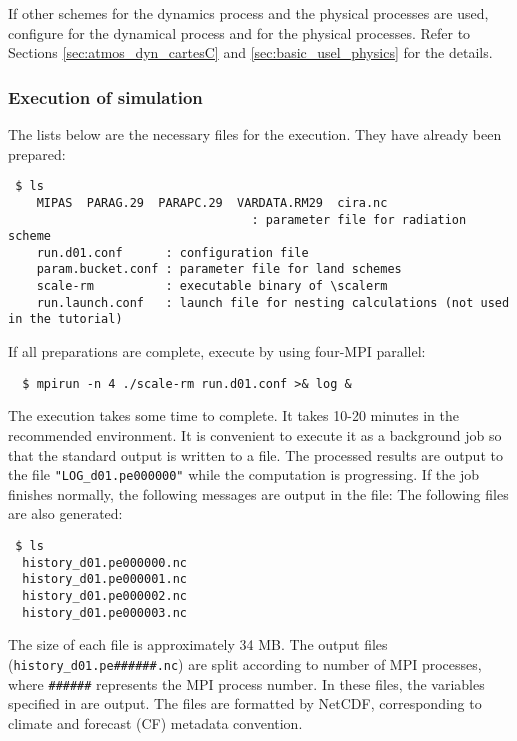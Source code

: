 If other schemes for the dynamics process and the physical processes are used,
configure  for the dynamical process and
 for the physical processes.
Refer to Sections \ref{sec:atmos_dyn_cartesC} and \ref{sec:basic_usel_physics}  for the details.


\subsubsection{Execution of simulation}

The lists below are the necessary files for the execution. They have already been prepared:
\begin{verbatim}
 $ ls
    MIPAS  PARAG.29  PARAPC.29  VARDATA.RM29  cira.nc
                                  : parameter file for radiation scheme
    run.d01.conf      : configuration file
    param.bucket.conf : parameter file for land schemes
    scale-rm          : executable binary of \scalerm
    run.launch.conf   : launch file for nesting calculations (not used in the tutorial)
\end{verbatim}
If all preparations are complete, execute \scalerm by using four-MPI parallel:
\begin{verbatim}
  $ mpirun -n 4 ./scale-rm run.d01.conf >& log &
\end{verbatim}
The execution takes some time to complete. It takes 10-20 minutes in the recommended environment. It is convenient to execute it as a background job  so that the standard output is written to a file. The processed results are output to the file \verb|"LOG_d01.pe000000"| while the computation is progressing.  If the job finishes normally, the following messages are output in the file:
The following files are also generated:
\begin{verbatim}
 $ ls
  history_d01.pe000000.nc
  history_d01.pe000001.nc
  history_d01.pe000002.nc
  history_d01.pe000003.nc
\end{verbatim}
The size of each file is approximately 34 MB.
The output files (\verb|history_d01.pe######.nc|) are
split according to number of MPI processes,
where \verb|######| represents the MPI process number.
In these files, the variables specified in  are output.
The files are formatted by NetCDF,
corresponding to climate and forecast (CF) metadata convention.




